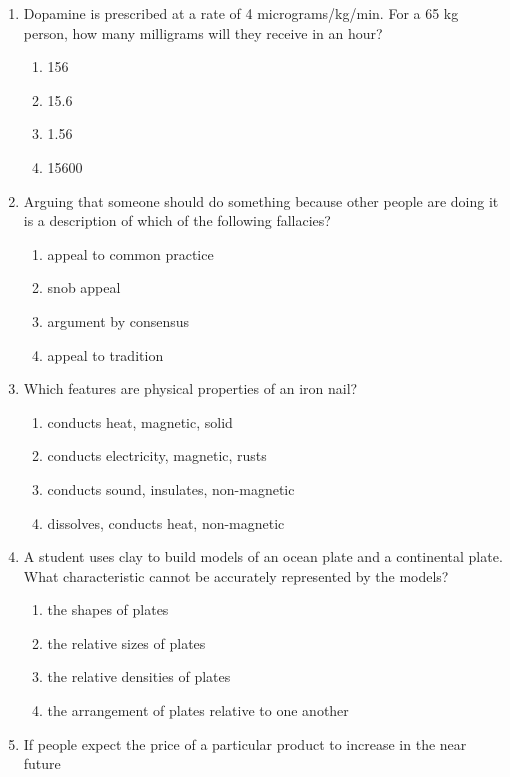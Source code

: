 \documentclass[12pt]{article}
\begin{document}
\begin{enumerate}[label=\arabic*.]
\begin{enumerate}[label=(\alph*)]
    \item 1 meter
\end{enumerate}
\item Dopamine is prescribed at a rate of 4 micrograms/kg/min. For a 65 kg person, how many milligrams will they receive in an hour?
\begin{enumerate}[label=(\alph*)]
    \item 156
    \item 15.6
    \item 1.56
    \item 15600
\end{enumerate}
\item Arguing that someone should do something because other people are doing it is a description of which of the following fallacies?
\begin{enumerate}[label=(\alph*)]
    \item appeal to common practice
    \item snob appeal
    \item argument by consensus
    \item appeal to tradition
\end{enumerate}
\item Which features are physical properties of an iron nail?
\begin{enumerate}[label=(\alph*)]
    \item conducts heat, magnetic, solid
    \item conducts electricity, magnetic, rusts
    \item conducts sound, insulates, non-magnetic
    \item dissolves, conducts heat, non-magnetic
\end{enumerate}
\item A student uses clay to build models of an ocean plate and a continental plate. What characteristic cannot be accurately represented by the models?
\begin{enumerate}[label=(\alph*)]
    \item the shapes of plates
    \item the relative sizes of plates
    \item the relative densities of plates
    \item the arrangement of plates relative to one another
\end{enumerate}
\item If people expect the price of a particular product to increase in the near future
\begin{enumerate}[label=(\alph*)]

\end{enumerate}
\end{enumerate}
\end{document}
